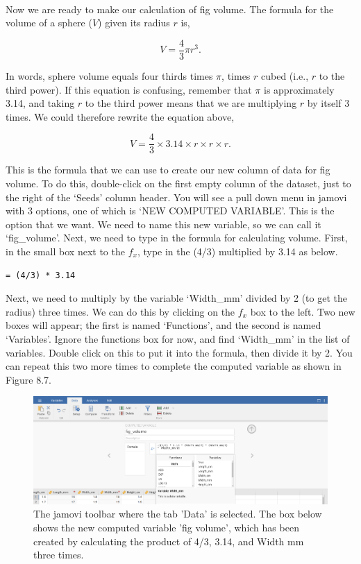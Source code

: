 \documentclass[
  openany]{krantz}
\begin{document}
\begin{verbatim}




\end{verbatim}

Now we are ready to make our calculation of fig volume.
The formula for the volume of a sphere (\(V\)) given its radius \(r\) is,

\[V = \frac{4}{3} \pi r^{3}.\]

In words, sphere volume equals four thirds times \(\pi\), times \(r\) cubed (i.e., \(r\) to the third power).
If this equation is confusing, remember that \(\pi\) is approximately 3.14, and taking \(r\) to the third power means that we are multiplying \(r\) by itself 3 times.
We could therefore rewrite the equation above,

\[V = \frac{4}{3} \times 3.14 \times r \times r \times r.\]

This is the formula that we can use to create our new column of data for fig volume.
To do this, double-click on the first empty column of the dataset, just to the right of the `Seeds' column header.
You will see a pull down menu in jamovi with 3 options, one of which is `NEW COMPUTED VARIABLE'.
This is the option that we want.
We need to name this new variable, so we can call it `fig\_volume'.
Next, we need to type in the formula for calculating volume.
First, in the small box next to the \(f_{x}\), type in the (4/3) multiplied by 3.14 as below.

\begin{verbatim}
= (4/3) * 3.14
\end{verbatim}

Next, we need to multiply by the variable `Width\_mm' divided by 2 (to get the radius) three times.
We can do this by clicking on the \(f_{x}\) box to the left.
Two new boxes will appear; the first is named `Functions', and the second is named `Variables'.
Ignore the functions box for now, and find `Width\_mm' in the list of variables.
Double click on this to put it into the formula, then divide it by 2.
You can repeat this two more times to complete the computed variable as shown in Figure 8.7.

\begin{figure}
\includegraphics[width=1\linewidth]{img/jamovi_compute_new_variable} \caption{The jamovi toolbar where the tab 'Data' is selected. The box below shows the new computed variable 'fig volume', which has been created by calculating the product of 4/3, 3.14, and Width mm three times.}\label{fig:unnamed-chunk-31}
\end{figure}
\end{document}
